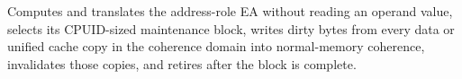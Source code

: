 Computes and translates the address-role EA without reading an operand value, selects its CPUID-sized maintenance block, writes dirty bytes from every data or unified cache copy in the coherence domain into normal-memory coherence, invalidates those copies, and retires after the block is complete.
